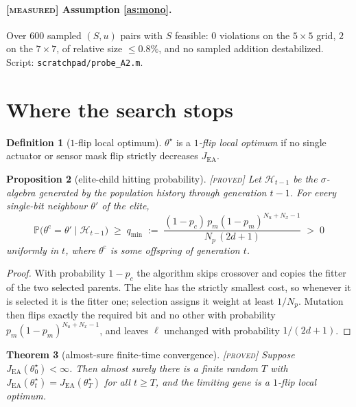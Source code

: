\documentclass[11pt]{article}
\newtheorem{theorem}{Theorem}
\newtheorem{proposition}[theorem]{Proposition}
\theoremstyle{definition}
\newtheorem{definition}[theorem]{Definition}
\theoremstyle{remark}
\newcommand{\JEA}{J_{\mathrm{EA}}}
\newcommand{\tagged}[1]{\textsc{[#1]}}
\begin{document}
\paragraph{\tagged{measured} Assumption \ref{as:mono}.}
Over $600$ sampled $(S,u)$ pairs with $S$ feasible: $0$ violations on the
$5\times5$ grid, $2$ on the $7\times7$, of relative size $\leq 0.8\%$, and no
sampled addition destabilized. Script: \texttt{scratchpad/probe\_A2.m}.

\section{Where the search stops}

\begin{definition}[$1$-flip local optimum]\label{def:loc}
$\theta^\star$ is a \emph{$1$-flip local optimum} if no single actuator or sensor
mask flip strictly decreases $\JEA$.
\end{definition}

\begin{proposition}[elite-child hitting probability]\label{prop:hit} \tagged{proved}
Let $\mathcal{H}_{t-1}$ be the $\sigma$-algebra generated by the population history
through generation $t-1$. For every single-bit neighbour $\theta'$ of the elite,
\begin{equation}\label{eq:qmin}
  \mathbb{P}\bigl(\theta^{\mathrm{c}} = \theta' \mid \mathcal{H}_{t-1}\bigr)
  \;\geq\; q_{\min}
  \;:=\; \frac{(1-p_c)\,p_m(1-p_m)^{N_u+N_x-1}}{N_p\,(2d+1)}
  \;>\; 0
\end{equation}
uniformly in $t$, where $\theta^{\mathrm{c}}$ is some offspring of generation $t$.
\end{proposition}

\begin{proof}
With probability $1-p_c$ the algorithm skips crossover and copies the fitter of the
two selected parents. The elite has the strictly smallest cost, so whenever it is
selected it is the fitter one; selection assigns it weight at least $1/N_p$.
Mutation then flips exactly the required bit and no other with probability
$p_m(1-p_m)^{N_u+N_x-1}$, and leaves $\ell$ unchanged with probability $1/(2d+1)$.
\end{proof}

\begin{theorem}[almost-sure finite-time convergence]\label{thm:conv} \tagged{proved}
Suppose $\JEA(\theta^\star_0) < \infty$. Then almost surely there is a finite random
$T$ with $\JEA(\theta^\star_t) = \JEA(\theta^\star_T)$ for all $t \geq T$, and the
limiting gene is a $1$-flip local optimum.
\end{theorem}
\end{document}
